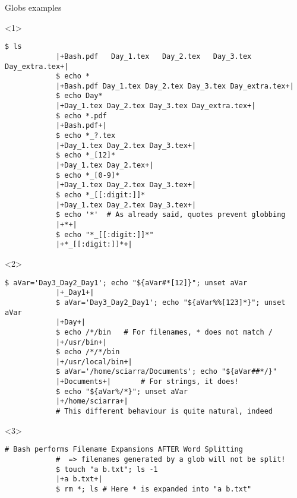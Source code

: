 \begin{frame}[fragile]{Globs examples}
    \vspace{-2mm}
    \begin{onlyenv}<1>
        \begin{lstlisting}[style=MyBash, style=oddnumbers, xleftmargin=3mm, xrightmargin=3mm]
            $ ls
            |+Bash.pdf   Day_1.tex   Day_2.tex   Day_3.tex   Day_extra.tex+|
            $ echo *
            |+Bash.pdf Day_1.tex Day_2.tex Day_3.tex Day_extra.tex+|
            $ echo Day*
            |+Day_1.tex Day_2.tex Day_3.tex Day_extra.tex+|
            $ echo *.pdf
            |+Bash.pdf+|
            $ echo *_?.tex
            |+Day_1.tex Day_2.tex Day_3.tex+|
            $ echo *_[12]*
            |+Day_1.tex Day_2.tex+|
            $ echo *_[0-9]*
            |+Day_1.tex Day_2.tex Day_3.tex+|
            $ echo *_[[:digit:]]*
            |+Day_1.tex Day_2.tex Day_3.tex+|
            $ echo '*'  # As already said, quotes prevent globbing
            |+*+|
            $ echo "*_[[:digit:]]*"
            |+*_[[:digit:]]*+|
        \end{lstlisting}
    \end{onlyenv}
    \begin{onlyenv}<2>
        \begin{lstlisting}[style=MyBash, style=oddnumbers, xleftmargin=3mm, xrightmargin=3mm, firstnumber=20]
            $ aVar='Day3_Day2_Day1'; echo "${aVar#*[12]}"; unset aVar
            |+_Day1+|
            $ aVar='Day3_Day2_Day1'; echo "${aVar%%[123]*}"; unset aVar
            |+Day+|
            $ echo /*/bin   # For filenames, * does not match /
            |+/usr/bin+|
            $ echo /*/*/bin
            |+/usr/local/bin+|
            $ aVar='/home/sciarra/Documents'; echo "${aVar##*/}"
            |+Documents+|       # For strings, it does!
            $ echo "${aVar%/*}"; unset aVar
            |+/home/sciarra+|
            # This different behaviour is quite natural, indeed
        \end{lstlisting}
    \end{onlyenv}
    \begin{onlyenv}<3>
        \begin{lstlisting}[style=MyBash, style=oddnumbers, xleftmargin=3mm, xrightmargin=3mm, firstnumber=32]
            # Bash performs Filename Expansions AFTER Word Splitting
            #  => filenames generated by a glob will not be split!
            $ touch "a b.txt"; ls -1
            |+a b.txt+|
            $ rm *; ls # Here * is expanded into "a b.txt"

\end{lstlisting}
\end{onlyenv}
\end{frame}

